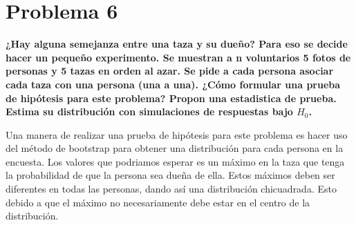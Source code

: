 \section*{Problema 6}

\textbf{¿Hay alguna semejanza entre una taza y su dueño? Para eso se decide hacer un pequeño experimento. Se muestran a n voluntarios 5 fotos de personas y 5 tazas en orden al azar. Se pide a cada persona asociar cada taza con una persona (una a una). ¿Cómo formular una prueba de hipótesis para este problema? Propon una estadistica de prueba. Estima su distribución con simulaciones de respuestas bajo $H_0$.}

Una manera de realizar una prueba de hipótesis para este problema es hacer uso del método de bootstrap para obtener una distribución para cada persona en la encuesta. Los valores que podriamos esperar es un máximo en la taza que tenga la probabilidad de que la persona sea dueña de ella. Estos máximos deben ser diferentes en todas las personas, dando así una distribución chicuadrada. Esto debido a que el máximo no necesariamente debe estar en el centro de la distribución.

